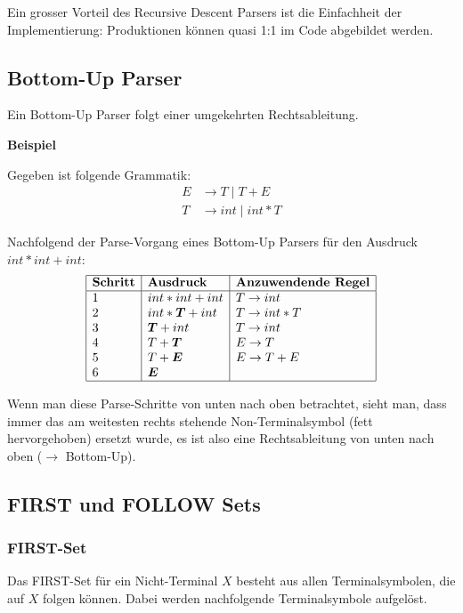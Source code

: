 Ein grosser Vorteil des Recursive Descent Parsers ist die Einfachheit der
Implementierung: Produktionen können quasi 1:1 im Code abgebildet werden.


\subsection{Bottom-Up Parser} 

Ein Bottom-Up Parser folgt einer umgekehrten Rechtsableitung.

\textbf{Beispiel}

Gegeben ist folgende Grammatik:
%
\begin{align*}
	E &\rightarrow T \mid T + E \\
	T &\rightarrow int \mid int * T
\end{align*}

Nachfolgend der Parse-Vorgang eines Bottom-Up Parsers für den Ausdruck $int * int + int$:
\[
	\begin{array}{|l|l|l|}
		\hline
		\textbf{Schritt} & \textbf{Ausdruck} & \textbf{Anzuwendende Regel} \\
		\hline
		1 & int * int + int & T \rightarrow int \\
		2 & int * \boldsymbol T + int & T \rightarrow int * T \\
		3 & \boldsymbol T + int & T \rightarrow int \\
		4 & T + \boldsymbol T & E \rightarrow T \\
		5 & T + \boldsymbol E & E \rightarrow T + E \\
		6 & \boldsymbol E & \\
		\hline
	\end{array}
\]

Wenn man diese Parse-Schritte von unten nach oben betrachtet, sieht man, dass immer das am weitesten
rechts stehende Non-Terminalsymbol (fett hervorgehoben) ersetzt wurde, es ist also eine
Rechtsableitung von unten nach oben ($\rightarrow$ Bottom-Up).


\subsection{FIRST und FOLLOW Sets}

\subsubsection{FIRST-Set}

Das FIRST-Set für ein Nicht-Terminal $X$ besteht aus allen Terminalsymbolen, die auf $X$ folgen können.
Dabei werden nachfolgende Terminalsymbole aufgelöst.

